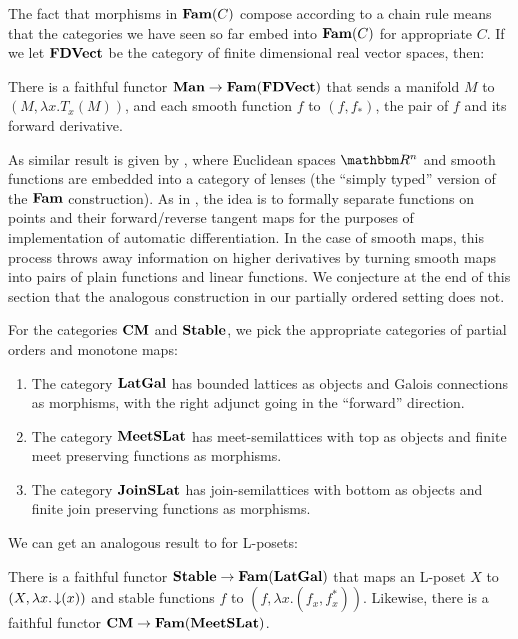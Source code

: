 The fact that morphisms in $\mathbf{Fam}(C)$ compose according to a chain rule
means that the categories we have seen so far embed into $\mathbf{Fam}(C)$ for
appropriate $C$. If we let $\mathbf{FDVect}$ be the category of finite
dimensional real vector spaces, then:

\begin{proposition}
  \label{prop:embed-manifolds}
  There is a faithful functor $\mathbf{Man} \to \mathbf{Fam}(\mathbf{FDVect})$ that sends a
  manifold $M$ to $(M, \lambda x. T_x(M))$, and each smooth function
  $f$ to $(f, f_*)$, the pair of $f$ and its forward derivative.
\end{proposition}

As similar result is given by \citet{cruttwell2022}, where Euclidean
spaces $\RR^n$ and smooth functions are embedded into a category of
lenses (the ``simply typed'' version of the $\mathbf{Fam}$ construction). As
in \citet{vakar22}, the idea is to formally separate functions on
points and their forward/reverse tangent maps for the purposes of
implementation of automatic differentiation. In the case of smooth
maps, this process throws away information on higher derivatives by
turning smooth maps into pairs of plain functions and linear
functions. We conjecture at the end of this section that the analogous
construction in our partially ordered setting does not.

For the categories $\mathbf{CM}$ and $\mathbf{Stable}$, we pick the appropriate
categories of partial orders and monotone maps:

\begin{definition}
  \item
  \begin{enumerate}
  \item The category $\mathbf{LatGal}$ has bounded lattices as objects and
    Galois connections as morphisms, with the right adjunct going in
    the ``forward'' direction.
  \item The category $\mathbf{MeetSLat}$ has meet-semilattices with top as
    objects and finite meet preserving functions as
    morphisms.
  \item The category $\mathbf{JoinSLat}$ has join-semilattices with bottom as
    objects and finite join preserving functions as
    morphisms.
  \end{enumerate}
\end{definition}

We can get an analogous result to  for L-posets:

\begin{proposition}
  \label{prop:embed-stable}
  There is a faithful functor $\mathbf{Stable} \to \mathbf{Fam}(\mathbf{LatGal})$ that maps an
  L-poset $X$ to $(X, \lambda x. \mathop{\downarrow}(x))$ and stable functions
  $f$ to $(f, \lambda x. (f_x, f^*_x))$. Likewise, there is a faithful
  functor $\mathbf{CM} \to \mathbf{Fam}(\mathbf{MeetSLat})$.
\end{proposition}

